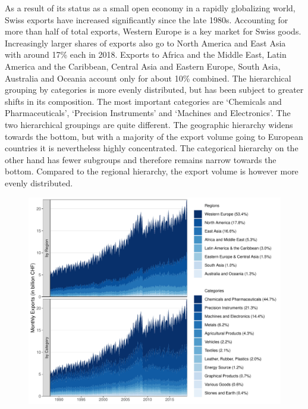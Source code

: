\documentclass[a4paper,fleqn,11pt]{article}
\begin{document}
As a result of its status as a small open economy in a rapidly globalizing world, Swiss exports have increased significantly since the late 1980s. Accounting for more than half of total exports, Western Europe is a key market for Swiss goods. Increasingly larger shares of exports also go to North America and East Asia with around 17\% each in 2018. Exports to Africa and the Middle East, Latin America and the Caribbean, Central Asia and Eastern Europe, South Asia, Australia and Oceania account only for about 10\% combined. The hierarchical grouping by categories is more evenly distributed, but has been subject to greater shifts in its composition. The most important categories are `Chemicals and Pharmaceuticals', `Precision Instruments' and `Machines and Electronics'. The two hierarchical groupings are quite different. The geographic hierarchy widens towards the bottom, but with a majority of the export volume going to European countries it is nevertheless highly concentrated. The categorical hierarchy on the other hand has fewer subgroups and therefore remains narrow towards the bottom. Compared to the regional hierarchy, the export volume is however more evenly distributed.

\begin{figure}[H]
	\includegraphics[width=\textwidth]{fig/fig_area}
	\label{fig:area}
\end{figure}
\end{document}
